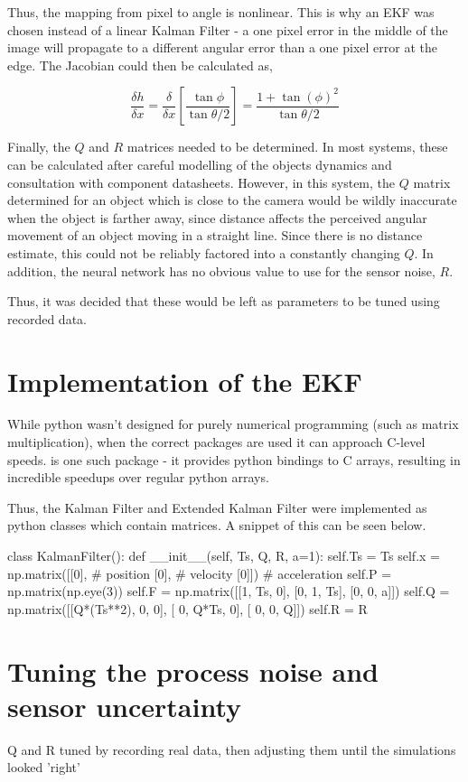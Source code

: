 Thus, the mapping from pixel to angle is nonlinear. This is why an EKF was chosen instead of a linear Kalman Filter - a one pixel error in the middle of the image will propagate to a different angular error than a one pixel error at the edge. The Jacobian could then be calculated as,

\[ \frac{\delta h}{\delta x} = \frac{\delta}{\delta x} \left[ \frac{\tan{\phi}}{\tan{\theta/2}} \right] = \frac{1 + \tan{(\phi)}^2}{\tan{\theta/2}} \]

Finally, the $Q$ and $R$ matrices needed to be determined. In most systems, these can be calculated after careful modelling of the objects dynamics and consultation with component datasheets. However, in this system, the $Q$ matrix determined for an object which is close to the camera would be wildly inaccurate when the object is farther away, since distance affects the perceived angular movement of an object moving in a straight line. Since there is no distance estimate, this could not be reliably factored into a constantly changing $Q$. In addition, the neural network has no obvious value to use for the sensor noise, $R$.

Thus, it was decided that these would be left as parameters to be tuned using recorded data.

\section{Implementation of the EKF}

While python wasn't designed for purely numerical programming (such as matrix multiplication), when the correct packages are used it can approach C-level speeds.  is one such package - it provides python bindings to C arrays, resulting in incredible speedups over regular python arrays.

Thus, the Kalman Filter and Extended Kalman Filter were implemented as python classes which contain  matrices. A snippet of this can be seen below. \\

\begin{python}
class KalmanFilter():
    def __init__(self, Ts, Q, R, a=1):
        self.Ts = Ts
        self.x = np.matrix([[0],  # position
                            [0],  # velocity
                            [0]]) # acceleration
        self.P = np.matrix(np.eye(3))
        self.F = np.matrix([[1, Ts,  0],
                            [0,  1, Ts],
                            [0,  0,  a]])
        self.Q = np.matrix([[Q*(Ts**2),    0, 0],
                            [        0, Q*Ts, 0],
                            [        0,    0, Q]])
        self.R = R
\end{python}

\section{Tuning the process noise and sensor uncertainty}

{\Large \color{red} Q and R tuned by recording real data, then adjusting them until the simulations looked 'right'}

